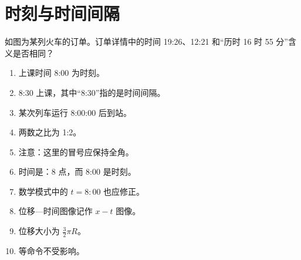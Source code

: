 \section{时刻与时间间隔}

如图为某列火车的订单。订单详情中的时间 19:26、12:21 和“历时 16 时 55 分”含义是否相同？

\begin{enumerate}
  \item 上课时间 8:00 为时刻。
  \item 8:30 上课，其中“8:30”指的是时间间隔。
  \item 某次列车运行 8:00:00 后到站。
  \item 两数之比为 1:2。
  \item 注意：这里的冒号应保持全角。
  \item 时间是：8 点，而 8:00 是时刻。
  \item 数学模式中的 $t=8:00$ 也应修正。
  \item 位移—时间图像记作 $x-t$ 图像。
  \item 位移大小为 $\frac{3}{2}\pi R$。
  \item {} 等命令不受影响。
\end{enumerate}
